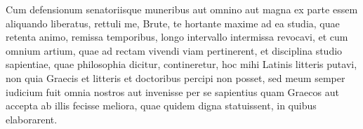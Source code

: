 \documentclass{article}
\begin{document}
\pstart%
Cum defensionum  senatoriisque muneribus aut omnino aut magna ex parte essem aliquando liberatus, rettuli me, Brute, te hortante maxime ad ea studia, quae retenta animo, remissa temporibus, longo intervallo intermissa revocavi, et cum omnium artium, quae ad rectam vivendi viam pertinerent,  et disciplina studio sapientiae, quae philosophia dicitur, contineretur, hoc mihi Latinis litteris  putavi, non quia  Graecis et litteris et doctoribus percipi non posset, sed meum semper iudicium fuit omnia nostros aut invenisse per se sapientius quam Graecos aut accepta ab illis fecisse meliora, quae quidem digna statuissent, in quibus elaborarent.
\pend

\endnumbering
\end{document}
